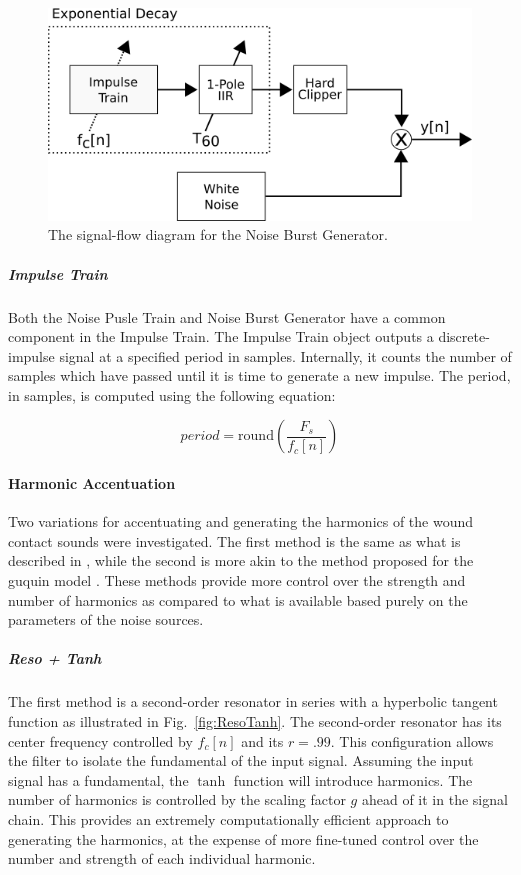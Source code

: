 \documentclass[../main.tex]{subfiles}
\begin{document}
\begin{figure}[h]
    \centering
    \includegraphics[scale=.5]{./images/diagrams/NoiseBurstGen.png}
    \caption{The signal-flow diagram for the Noise Burst Generator.}
    \label{fig:NoiseBurstGen}
\end{figure}

\subparagraph{Impulse Train}
\label{subpar:Ch3ImpulseTrain}
Both the Noise Pusle Train and Noise Burst Generator have a common component in the Impulse Train. The Impulse Train object outputs a discrete-impulse signal at a specified period in samples. Internally, it counts the number of samples which have passed until it is time to generate a new impulse. The period, in samples, is computed using the following equation:

\begin{equation}
    period = \text{round}\left(\frac{F_s}{f_c[n]}\right)
    \label{eq:f_cQuantization}
\end{equation}

\paragraph{Harmonic Accentuation}
\label{para:Ch3HarmonicAccentuation}
Two variations for accentuating and generating the harmonics of the wound contact sounds were investigated. The first method is the same as what is described in , while the second is more akin to the method proposed for the guquin model . These methods provide more control over the strength and number of harmonics as compared to what is available based purely on the parameters of the noise sources.

\subparagraph{Reso + Tanh}
\label{subpar:Ch3Reso+Tanh}
The first method is a second-order resonator in series with a hyperbolic tangent function as illustrated in Fig.~\ref{fig:ResoTanh}. The second-order resonator has its center frequency controlled by $f_c[n]$ and its $r = .99$. This configuration allows the filter to isolate the fundamental of the input signal. Assuming the input signal has a fundamental, the $\tanh$ function will introduce harmonics. The number of harmonics is controlled by the scaling factor $g$ ahead of it in the signal chain. This provides an extremely computationally efficient approach to generating the harmonics, at the expense of more fine-tuned control over the number and strength of each individual harmonic.
\end{document}
